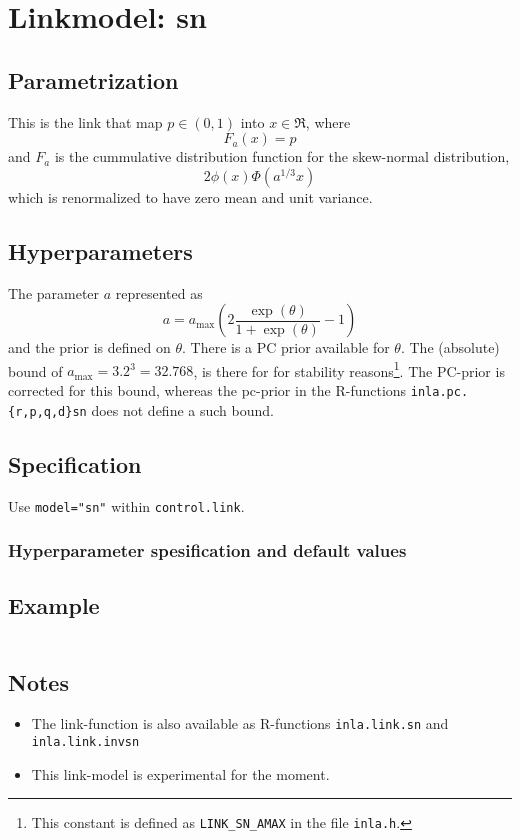 \documentclass[a4paper,11pt]{article}
\begin{document}
\section*{Linkmodel: sn}

\subsection*{Parametrization}

This is the link that map $p\in (0,1)$ into $x\in\Re$, where
\begin{displaymath}
    F_{a}(x) = p
\end{displaymath}
and $F_{a}$ is the cummulative distribution function for the
skew-normal distribution,
\begin{displaymath}
    2\phi(x)\Phi(a^{1/3}x)
\end{displaymath}
which is renormalized to have zero mean and unit variance.

\subsection*{Hyperparameters}

The  parameter $a$ represented as
\begin{displaymath}
    a = a_{\text{max}} \left(2\frac{\exp(\theta)}{1+ \exp(\theta)} -1\right)
\end{displaymath}
and the prior is defined on $\theta$. There is a PC prior available
for $\theta$. The (absolute) bound of
$a_{\text{max}} = 3.2^{3} = 32.768$, is there for for stability
reasons\footnote{This constant is defined as \texttt{LINK\_SN\_AMAX}
    in the file \texttt{inla.h}.}. The PC-prior is corrected for
this bound, whereas the pc-prior in the R-functions
\texttt{inla.pc.\{r,p,q,d\}sn} does not define a such bound.

\subsection*{Specification}

Use \texttt{model="sn"} within \texttt{control.link}.  

\subsubsection*{Hyperparameter spesification and default values}


\subsection*{Example}

\begin{verbatim}
\end{verbatim}

\subsection*{Notes}

\begin{itemize}
\item The link-function is also available as R-functions
    \texttt{inla.link.sn} and \texttt{inla.link.invsn}
\item This link-model is experimental for the moment.
\end{itemize}
\end{document}
